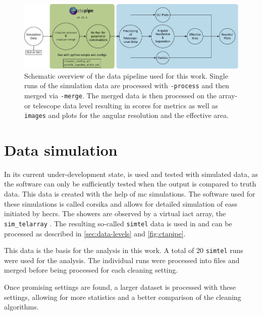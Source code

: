 \begin{figure}
    \centering
    \includegraphics[width=\textwidth]{graphics/data_pipeline.pdf}
    \caption{Schematic overview of the data pipeline used for this work. Single runs of the simulation
    data are processed with \ctapipe\texttt{-process} and then merged via \ctapipe\texttt{-merge}.
    The merged data is then processed on the array- or telescope data level resulting in scores for metrics
    as well as \dlo{} \texttt{images} and plots for the angular resolution and the effective area.}
    \label{fig:data-processing}
\end{figure}


\section{Data simulation}
\label{sec:data-simulation}

In its current under-development state, \ctapipe{} is used and tested with simulated data, as the software
can only be sufficiently tested when the output is compared to truth data. This data is created with the help of
\gls{mc} simulations. The software used for these simulations is called \gls{corsika} \cite{corsika} and
allows for detailed simulation of \glspl{eas} initiated by \glspl{hecr}. The showers are observed by
a virtual \gls{iact} array, the \texttt{sim\_telarray} \cite{bernlohr2008}. The resulting so-called
\texttt{simtel} data is used in \ctapipe{} and can be processed as described in \autoref{sec:data-levels}
and \autoref{fig:ctapipe}.

This data is the basis for the analysis in this work. A total of 
\(\num{20}\) \texttt{simtel} runs were used for the analysis. The individual runs were processed into \dlo{} files
and merged before being processed for each cleaning setting.

Once promising settings are found, a larger dataset is processed with these settings, allowing for more
statistics and a better comparison of the cleaning algorithms.

